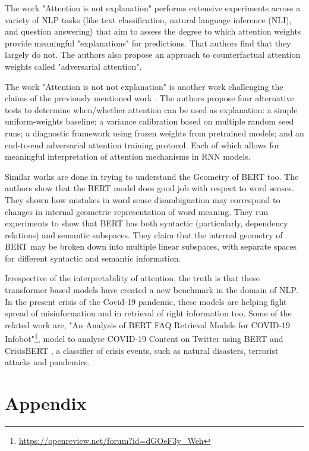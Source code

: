 \documentclass{article}
\begin{document}
The work "Attention is not explanation" \cite{jain2019attention} performs extensive experiments across a variety of NLP tasks (like text classification, natural language inference (NLI), and question answering) that aim to assess the degree to which attention weights provide meaningful "explanations" for predictions. That authors find that they largely do not. The authors also propose an approach to counterfactual attention weights called "adversarial attention".

The work "Attention is not not explanation" \cite{wiegreffe2019attention} is another work challenging the claims of the previously mentioned work \cite{jain2019attention}. The authors propose four alternative tests to determine when/whether attention can be used as explanation: a simple uniform-weights baseline; a variance calibration based on multiple random seed runs; a diagnostic framework using frozen weights from pretrained models; and an end-to-end adversarial attention training protocol. Each of which allows for meaningful interpretation of attention mechanisms in RNN models.

Similar works are done in trying to understand the Geometry of BERT \cite{DBLP:journals/corr/abs-1906-02715} too. The authors show that the BERT model does good job with respect to word senses. They shown how mistakes in word sense disambiguation may correspond to changes in internal geometric representation of word meaning. They run experiments to show that BERT has both syntactic (particularly, dependency relations) and semantic subspaces. They claim that the internal geometry of BERT may be broken down into multiple linear
subspaces, with separate spaces for different syntactic and semantic information.

Irrespective of the interpretability of attention, the truth is that these transformer based models have created a new benchmark in the domain of NLP. In the present crisis of the Covid-19 pandemic, these models are helping fight spread of misinformation and in retrieval of right information too.
Some of the related work are, "An Analysis of BERT FAQ Retrieval Models for COVID-19 Infobot"\footnote{\url{https://openreview.net/forum?id=dGOeF3y_Weh}}, model to analyse COVID-19 Content on Twitter using BERT \cite{mller2020covidtwitterbert} and CrisisBERT \cite{liu2020crisisbert}, a classifier of crisis events, such as natural disasters, terrorist attacks and pandemics.



\appendix
\section*{Appendix}
\end{document}
